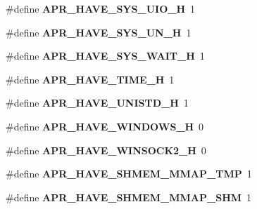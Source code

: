 \begin{DoxyCompactItemize}
\item 
\hypertarget{group__apr__platform_gabaeaf82b82e76979dfbe64a43e02b23f}{\#define {\bfseries A\-P\-R\-\_\-\-H\-A\-V\-E\-\_\-\-S\-Y\-S\-\_\-\-U\-I\-O\-\_\-\-H}~1}\label{group__apr__platform_gabaeaf82b82e76979dfbe64a43e02b23f}

\item 
\hypertarget{group__apr__platform_ga342802d31427d75aa8d9508fc42862f1}{\#define {\bfseries A\-P\-R\-\_\-\-H\-A\-V\-E\-\_\-\-S\-Y\-S\-\_\-\-U\-N\-\_\-\-H}~1}\label{group__apr__platform_ga342802d31427d75aa8d9508fc42862f1}

\item 
\hypertarget{group__apr__platform_ga4358584279b9bef5e9befef3e70be3a0}{\#define {\bfseries A\-P\-R\-\_\-\-H\-A\-V\-E\-\_\-\-S\-Y\-S\-\_\-\-W\-A\-I\-T\-\_\-\-H}~1}\label{group__apr__platform_ga4358584279b9bef5e9befef3e70be3a0}

\item 
\hypertarget{group__apr__platform_gad8de7d46efa8bf6404fcb105cb9fec66}{\#define {\bfseries A\-P\-R\-\_\-\-H\-A\-V\-E\-\_\-\-T\-I\-M\-E\-\_\-\-H}~1}\label{group__apr__platform_gad8de7d46efa8bf6404fcb105cb9fec66}

\item 
\hypertarget{group__apr__platform_ga5027a53811b56363639e832027752456}{\#define {\bfseries A\-P\-R\-\_\-\-H\-A\-V\-E\-\_\-\-U\-N\-I\-S\-T\-D\-\_\-\-H}~1}\label{group__apr__platform_ga5027a53811b56363639e832027752456}

\item 
\hypertarget{group__apr__platform_ga129087a39c180d855be6585c9efe2ff2}{\#define {\bfseries A\-P\-R\-\_\-\-H\-A\-V\-E\-\_\-\-W\-I\-N\-D\-O\-W\-S\-\_\-\-H}~0}\label{group__apr__platform_ga129087a39c180d855be6585c9efe2ff2}

\item 
\hypertarget{group__apr__platform_ga46a930f2ecfa34bfa627a8f18532bceb}{\#define {\bfseries A\-P\-R\-\_\-\-H\-A\-V\-E\-\_\-\-W\-I\-N\-S\-O\-C\-K2\-\_\-\-H}~0}\label{group__apr__platform_ga46a930f2ecfa34bfa627a8f18532bceb}

\item 
\hypertarget{group__apr__platform_gaac072bb1db885925d1d426a1650aee18}{\#define {\bfseries A\-P\-R\-\_\-\-H\-A\-V\-E\-\_\-\-S\-H\-M\-E\-M\-\_\-\-M\-M\-A\-P\-\_\-\-T\-M\-P}~1}\label{group__apr__platform_gaac072bb1db885925d1d426a1650aee18}

\item 
\hypertarget{group__apr__platform_gaae95d5ab380a1519c849b3f54f53dbdb}{\#define {\bfseries A\-P\-R\-\_\-\-H\-A\-V\-E\-\_\-\-S\-H\-M\-E\-M\-\_\-\-M\-M\-A\-P\-\_\-\-S\-H\-M}~1}\label{group__apr__platform_gaae95d5ab380a1519c849b3f54f53dbdb}


\end{DoxyCompactItemize}
